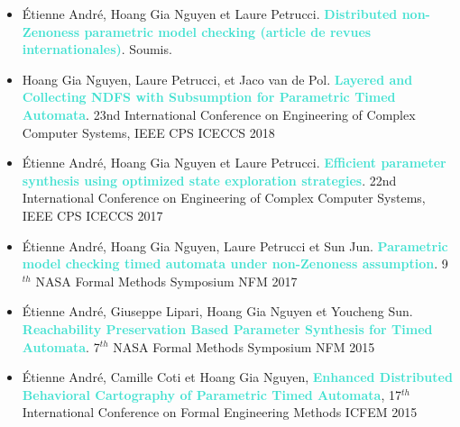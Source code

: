 \documentclass[10pt,a4paper,ragged2e]{altacv}
\begin{document}
	\begin{itemize}
		\item Étienne André, Hoang Gia Nguyen et  Laure Petrucci. \textcolor{Turquoise}{\textbf{Distributed non-Zenoness parametric model checking (article de revues internationales)}}. Soumis.
		\item Hoang Gia Nguyen, Laure Petrucci, et Jaco van de Pol. \textcolor{Turquoise}{\textbf{Layered and Collecting NDFS with Subsumption for Parametric Timed Automata}}. 23nd International Conference on Engineering of Complex Computer Systems, IEEE CPS {ICECCS 2018}
		\item Étienne André, Hoang Gia Nguyen et Laure Petrucci. \textcolor{Turquoise}{\textbf{Efficient parameter synthesis using optimized state exploration strategies}}. 22nd International Conference on Engineering of Complex Computer Systems, IEEE CPS {ICECCS 2017}
		\item Étienne André, Hoang Gia Nguyen,  Laure Petrucci et Sun Jun. \textcolor{Turquoise}{\textbf{Parametric model checking timed automata under non-Zenoness assumption}}. 
		9$^{th}$ NASA Formal Methods Symposium {NFM 2017}
		\item Étienne André, Giuseppe Lipari, Hoang Gia Nguyen et Youcheng Sun. \textcolor{Turquoise}{\textbf{Reachability Preservation Based Parameter Synthesis for Timed Automata}}. 
		7$^{th}$ NASA Formal Methods Symposium {NFM 2015}
		\item Étienne André, Camille Coti et Hoang Gia Nguyen, \textcolor{Turquoise}{\textbf{Enhanced Distributed Behavioral Cartography of Parametric Timed Automata}}, 17$^{th}$ International Conference on Formal Engineering Methods ICFEM 2015
	\end{itemize}
	
%	
%	

	
	
	\medskip
	
	
\end{document}
